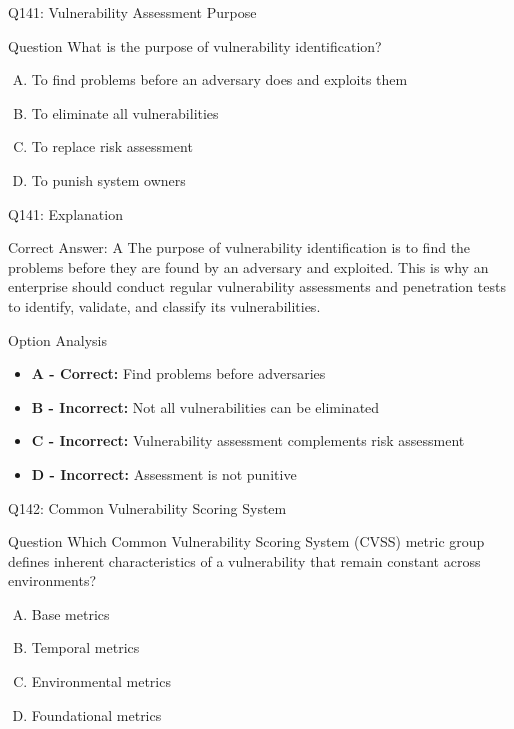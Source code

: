 \documentclass{beamer}
\begin{document}
	\begin{frame}{Q141: Vulnerability Assessment Purpose}
		\begin{block}{Question}
			What is the purpose of vulnerability identification?
		\end{block}
		\begin{enumerate}[(A)]
			\item To find problems before an adversary does and exploits them
			\item To eliminate all vulnerabilities
			\item To replace risk assessment
			\item To punish system owners
		\end{enumerate}
	\end{frame}
	
	\begin{frame}{Q141: Explanation}
		\begin{block}{Correct Answer: A}
			The purpose of vulnerability identification is to find the problems before they are found by an adversary and exploited. This is why an enterprise should conduct regular vulnerability assessments and penetration tests to identify, validate, and classify its vulnerabilities.
		\end{block}
		\begin{block}{Option Analysis}
			\begin{itemize}
				\item \textbf{A - Correct:} Find problems before adversaries
				\item \textbf{B - Incorrect:} Not all vulnerabilities can be eliminated
				\item \textbf{C - Incorrect:} Vulnerability assessment complements risk assessment
				\item \textbf{D - Incorrect:} Assessment is not punitive
			\end{itemize}
		\end{block}
	\end{frame}
	
	\begin{frame}{Q142: Common Vulnerability Scoring System}
		\begin{block}{Question}
			Which Common Vulnerability Scoring System (CVSS) metric group defines inherent characteristics of a vulnerability that remain constant across environments?
		\end{block}
		\begin{enumerate}[(A)]
			\item Base metrics
			\item Temporal metrics
			\item Environmental metrics
			\item Foundational metrics
		\end{enumerate}
	\end{frame}
	
\end{document}
